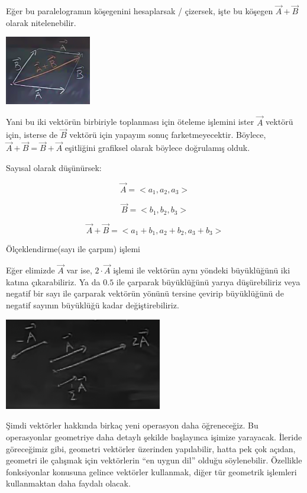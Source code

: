 \documentclass[12pt,fleqn]{article}\usepackage{../../common}
\begin{document}
Eğer bu paralelogramın köşegenini hesaplarsak / çizersek, işte bu köşegen
$\vec{A} + \vec{B}$ olarak nitelenebilir. 

\begin{center}
\includegraphics[height=3cm]{1_9.png}
\end{center}

Yani bu iki vektörün birbiriyle toplanması için öteleme işlemini ister $\vec{A}$
vektörü için, isterse de $\vec{B}$ vektörü için yapayım sonuç
farketmeyecektir. Böylece, $\vec{A} + \vec{B} = \vec{B} + \vec{A}$ eşitliğini
grafiksel olarak böylece doğrulamış olduk.

Sayısal olarak düşünürsek:

$$ \vec{A} = < a_1, a_2, a_3 > $$

$$ \vec{B} = < b_1, b_2, b_3 > $$

$$ \vec{A} + \vec{B} = < a_1+b_1, a_2+b_2, a_3+b_3 > $$

Ölçeklendirme(sayı ile çarpım) işlemi

Eğer elimizde $\vec{A}$ var ise, $2 \cdot \vec{A}$ işlemi ile vektörün aynı 
yöndeki büyüklüğünü iki katına çıkarabiliriz. Ya da $0.5$ ile çarparak 
büyüklüğünü yarıya düşürebiliriz veya negatif bir sayı ile çarparak vektörün 
yönünü tersine çevirip büyüklüğünü de negatif sayının büyüklüğü kadar 
değiştirebiliriz.

\begin{center}
\includegraphics[height=4cm]{1_10.png}
\end{center}

Şimdi vektörler hakkında birkaç yeni operasyon daha öğreneceğiz. Bu
operasyonlar geometriye daha detaylı şekilde başlayınca işimize
yarayacak. İleride göreceğimiz gibi, geometri vektörler üzerinden
yapılabilir, hatta pek çok açıdan, geometri ile çalışmak için vektörlerin
``en uygun dil'' olduğu söylenebilir. Özellikle fonksiyonlar konusuna
gelince vektörler kullanmak, diğer tür geometrik işlemleri kullanmaktan
daha faydalı olacak. 
\end{document}
